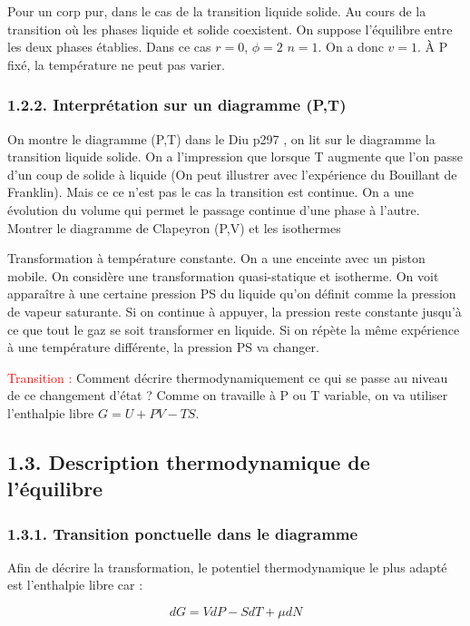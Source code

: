 \documentclass[french, a4paper, 10pt, twocolumn, landscape]{article}
\begin{document}
Pour un corp pur, dans le cas de la transition liquide solide. Au cours de la transition où les phases liquide et solide coexistent. On suppose l'équilibre entre les deux phases établies. Dans ce cas $r=0$, $\phi= 2$ $n=1$. On a donc $v=1$. À P fixé, la température ne peut pas varier.

\subsubsection*{1.2.2. Interprétation sur un diagramme (P,T)}

On montre le diagramme (P,T) dans le Diu p297 , on lit sur le diagramme la transition liquide solide. On a l'impression que lorsque T augmente que l'on passe d'un coup de solide à liquide (On peut illustrer avec l'expérience du Bouillant de Franklin). Mais ce ce n'est pas le cas la transition est continue. On a une évolution du volume qui permet le passage continue d'une phase à l'autre. Montrer le diagramme de Clapeyron (P,V) et les isothermes\medskip

Transformation à température constante. On a une enceinte avec un piston mobile. On considère une transformation quasi-statique et isotherme. On voit apparaître à une certaine pression PS du liquide qu’on définit comme la pression de vapeur saturante. Si on continue à appuyer, la pression reste constante jusqu’à ce que tout le gaz se soit transformer en liquide. Si on répète la même expérience à une température différente, la pression PS va changer.


\textcolor{red}{Transition : } Comment décrire thermodynamiquement ce qui se passe au niveau de ce changement d'état ? Comme on travaille à P ou T variable, on va utiliser l'enthalpie libre $G = U+PV-TS$.
  

\subsection*{1.3. Description thermodynamique de l'équilibre}

\subsubsection*{1.3.1. Transition ponctuelle dans le diagramme}

Afin de décrire la transformation, le potentiel thermodynamique le plus adapté est l'enthalpie libre car :

\begin{equation}
  dG=VdP-SdT+\mu dN
\end{equation}
\end{document}
